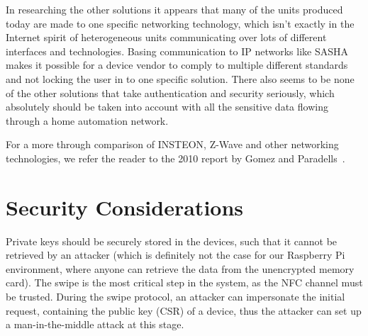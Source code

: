 In researching the other solutions it appears that many of the units produced today are made to one specific networking technology, which isn't exactly in the Internet spirit of heterogeneous units communicating over lots of different interfaces and technologies. Basing communication to IP networks like SASHA makes it possible for a device vendor to comply to multiple different standards and not locking the user in to one specific solution. There also seems to be none of the other solutions that take authentication and security seriously, which absolutely should be taken into account with all the sensitive data flowing through a home automation network.

For a more through comparison of INSTEON, Z-Wave and other networking technologies, we refer the reader to the 2010 report by Gomez and Paradells~\cite{comparison-of-technologies}.


\section{Security Considerations}

Private keys should be securely stored in the devices, such that it cannot be retrieved by an attacker (which is definitely not the case for our Raspberry Pi environment, where anyone can retrieve the data from the unencrypted memory card).
The swipe is the most critical step in the system, as the NFC channel must be trusted. During the swipe protocol, an attacker can impersonate the initial request, containing the public key (CSR) of a device, thus the attacker can set up a man-in-the-middle attack at this stage.
